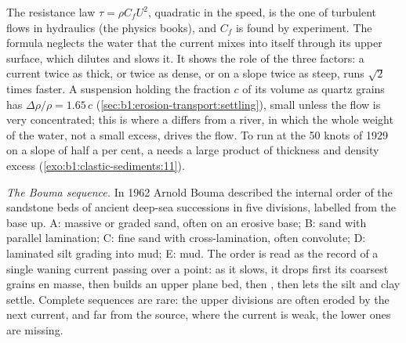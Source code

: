 The resistance law $\tau = \rho C_f U^2$, quadratic in the speed, is the one of
turbulent flows in hydraulics (the physics books), and $C_f$ is found by
experiment. The formula neglects the water that the current mixes into
itself through its upper surface, which dilutes and slows it. It shows the role
of the three factors: a current twice as thick, or twice as dense, or on a slope
twice as steep, runs $\sqrt 2$ times faster. A suspension holding the
fraction $c$ of its volume as quartz grains has $\Delta\rho/\rho = 1.65\,c$
(\cref{sec:b1:erosion-transport:settling}), small unless the flow is very
concentrated; this is where a  differs from a river, in which
the whole weight of the water, not a small excess, drives the flow. To run at the 50 knots of 1929 on a slope of half a per cent,
a  needs a large product of thickness and density excess
(\cref{exo:b1:clastic-sediments:11}).

\emph{The Bouma sequence.} In 1962 Arnold Bouma described the internal order of
the sandstone beds of ancient deep-sea successions in five divisions, labelled
from the base up. A: massive or graded sand, often on an erosive base; B: sand
with parallel lamination; C: fine sand with  cross-lamination, often
convolute; D: laminated silt grading into mud; E: mud. The order is read as the
record of a single waning current passing over a point: as it slows, it drops
first its coarsest grains en masse, then builds an upper plane bed, then
, then lets the silt and clay settle. Complete sequences are rare: the
upper divisions are often eroded by the next current, and far from the source,
where the current is weak, the lower ones are missing.

